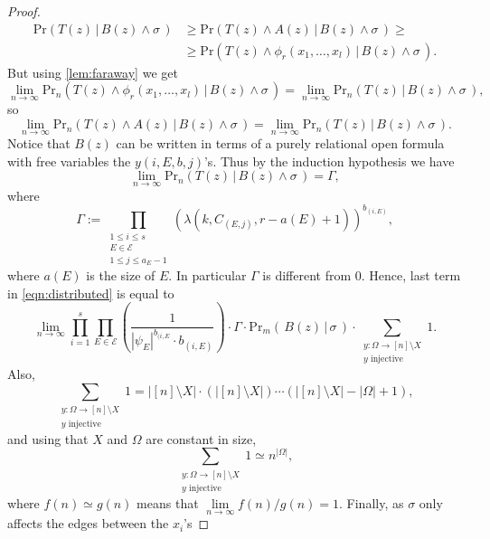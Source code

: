 \documentclass[11pt,notitlepage,a4paper]{article}
\theoremstyle{definition}
\newcommand{\Ln}{\lim\limits_{n\to \infty}}
\begin{document}
\begin{proof}
	\begin{align*} 
	\mathrm{Pr}( T(z)  \, | \, B(z) \wedge \sigma \, ) &
	\geq \mathrm{Pr}( T(z) \wedge A(z)  \, | \, B(z) \wedge \sigma \, ) \geq \\ 
	& \geq \mathrm{Pr}(T(z) \wedge \phi_r(x_1,\dots,x_l) 
	\, | \, B(z) \wedge \sigma \, ).
	\end{align*}
	But using \cref{lem:faraway} we get
	\[ \Ln  \mathrm{Pr}_n(T(z) \wedge \phi_r(x_1,\dots,x_l)
	\, | \, B(z) \wedge \sigma \, ) = 
	\Ln \mathrm{Pr}_n(T(z)\, | \, B(z) \wedge \sigma \, ), \]
	so
	\begin{equation} 
	\Ln  \mathrm{Pr}_n(T(z) \wedge A(z)
	\, | \, B(z) \wedge \sigma \, ) = 
	\Ln \mathrm{Pr}_n(T(z)\, | \, B(z) \wedge \sigma \, ). 
	\end{equation}
 	Notice that $B(z)$ can be written in terms of a purely relational
 	open formula with free variables the $y(i,E,b,j)$'s.
 	Thus by the induction hypothesis we have
 	\[\Ln \mathrm{Pr}_n( T(z)  \, | \, B(z) \wedge \sigma \, )= \Gamma, \]
 	where 
 	\begin{equation}\label{eqn:gammadef}
 	\Gamma:=\prod_{\substack{1\leq i \leq s \\ E\in \mathcal{E}\\
 	1\leq j \leq a_E - 1 }} (\lambda(k,C_{(E,j)},r-a(E)+1))^{b_{(i,E)}},
 	\end{equation}
 	where $a(E)$ is the size of $E$.
 	In particular $\Gamma$ is different from $0$.
 	Hence, last term in \cref{eqn:distributed} is equal to
 	\begin{equation} \label{eqn:distributed2}
 	\Ln	\prod_{i=1}^{s}
 		\prod_{E\in \mathcal{E}} \left(\frac{1}{|\psi_E|^{b_{(i,E}} \cdot b_{(i,E)}}\right) 
 		\cdot \Gamma \cdot
 		\mathrm{Pr}_m(\, B(z) \, | \, \sigma \, )
 		\cdot \sum_{\substack{y:\Omega \rightarrow [n]\setminus X\\ y \text{ injective}}} 1.
 	\end{equation} 
 	Also,
 	\[\sum_{\substack{y:\Omega \rightarrow [n]\setminus X\\ y \text{ injective}}} 1 =|[n]\setminus X|\cdot (|[n]\setminus X|)\cdots 
 	(|[n]\setminus X|-|\Omega|+1), \]
 	and using that $X$ and $\Omega$ are constant in size,
 	\begin{equation}\label{eqn:sumones}
 	\sum_{\substack{y:\Omega \rightarrow [n]\setminus X\\ y \text{ injective}}} 1 \simeq n^{|\Omega|},
 	\end{equation}
 	where $f(n)\simeq g(n)$ means that $\Ln f(n)/g(n)=1$.
 	Finally, as $\sigma$ only affects the edges between the $x_i$'s

\end{proof}
\end{document}
